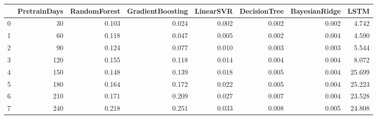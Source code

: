 \begin{tabular}{lrrrrrrr}
\toprule
{} &  PretrainDays &  RandomForest &  GradientBoosting &  LinearSVR &  DecisionTree &  BayesianRidge &   LSTM \\
\midrule
0 &            30 &         0.103 &             0.024 &      0.002 &         0.002 &          0.002 &  4.742 \\
1 &            60 &         0.118 &             0.047 &      0.005 &         0.002 &          0.004 &  4.590 \\
2 &            90 &         0.124 &             0.077 &      0.010 &         0.003 &          0.003 &  5.544 \\
3 &           120 &         0.155 &             0.118 &      0.014 &         0.004 &          0.004 &  8.072 \\
4 &           150 &         0.148 &             0.139 &      0.018 &         0.005 &          0.004 & 25.699 \\
5 &           180 &         0.164 &             0.172 &      0.022 &         0.005 &          0.004 & 25.223 \\
6 &           210 &         0.171 &             0.209 &      0.027 &         0.007 &          0.004 & 23.528 \\
7 &           240 &         0.218 &             0.251 &      0.033 &         0.008 &          0.005 & 24.808 \\
\bottomrule
\end{tabular}
